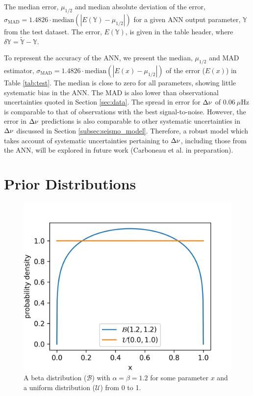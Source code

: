 \begin{table}
	\centering
	\caption[The median error and median absolute deviation of the error for each ANN output parameter from the test dataset.]{The median error, $\mu_{1/2}$ and median absolute deviation of the error, $\sigma_\mathrm{MAD} = 1.4826\cdot\mathrm{median}(|E(\mathbb{Y}) - \mu_{1/2}|)$ for a given ANN output parameter, $\mathbb{Y}$ from the test dataset. The error, $E(\mathbb{Y})$, is given in the table header, where $\delta \mathbb{Y} = \widetilde{\mathbb{Y}} - \mathbb{Y}$.}
	\label{tab:test}
        
\end{table}

To represent the accuracy of the ANN, we present the median, $\mu_{1/2}$ and MAD estimator, $\sigma_\mathrm{MAD} = 1.4826\cdot\mathrm{median}(|E(x) - \mu_{1/2}|)$ of the error ($E(x)$) in Table \ref{tab:test}. The median is close to zero for all parameters, showing little systematic bias in the ANN. The MAD is also lower than observational uncertainties quoted in Section \ref{sec:data}. The spread in error for ${\Delta\nu}$ of $\SI{0.06}{\mu\Hz}$ is comparable to that of observations with the best signal-to-noise. However, the error in ${\Delta\nu}$ predictions is also comparable to other systematic uncertainties in ${\Delta\nu}$ discussed in Section \ref{subsec:seismo_model}. Therefore, a robust model which takes account of systematic uncertainties pertaining to ${\Delta\nu}$, including those from the ANN, will be explored in future work (Carboneau et al. in preparation).

\section{Prior Distributions}\label{sec:beta}

\begin{figure}[tb]
    \centering
    \includegraphics{figures/beta_distribution.png}
    \caption[A beta distribution compared to a uniform distribution.]{A beta distribution ($\mathcal{B}$) with $\alpha = \beta = 1.2$ for some parameter $x$ and a uniform distribution ($\mathcal{U}$) from 0 to 1.}
    \label{fig:beta}
\end{figure}

